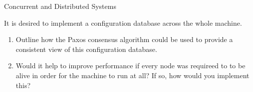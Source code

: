 \documentclass{tripos}  %
\begin{document}
\begin{question}[MockIB,year=2024,paper=2,question=1,author=rrw]{Concurrent and Distributed Systems}
\begin{enumerate}
  It is desired to implement a configuration database across the whole machine.
  \begin{enumerate}
  \item Outline how the Paxos consensus algorithm could be used to provide a consistent view of this configuration database. 
  \item Would it help to improve performance if every node was requireed to to be alive in order for the machine to run at all? If so, how would you implement this? 
    \end{enumerate}
\end{enumerate}
\end{question}
\end{document}
